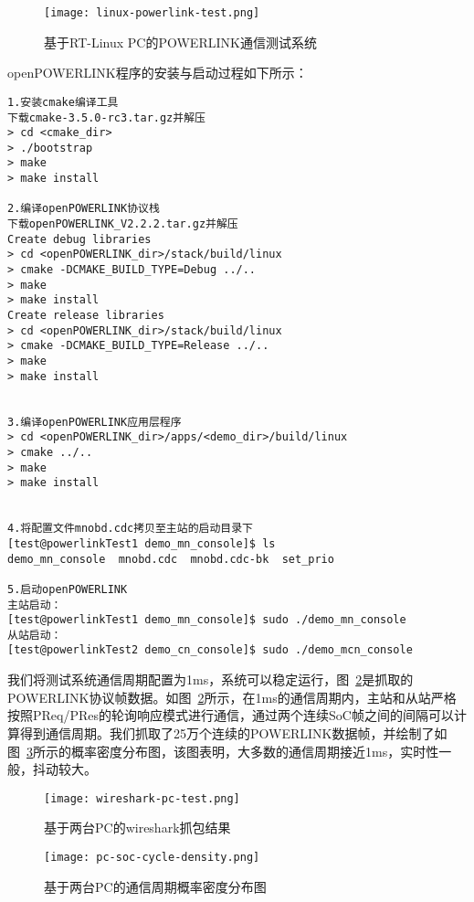 \begin{figure}[!htb]
  \centering
  \texttt{[image: linux-powerlink-test.png]}
  \caption{基于RT-Linux PC的POWERLINK通信测试系统}
  \label{fig:linux-powerlink-test}
\end{figure}

openPOWERLINK程序的安装与启动过程如下所示：

\begin{lstlisting}
1.安装cmake编译工具
下载cmake-3.5.0-rc3.tar.gz并解压
> cd <cmake_dir>
> ./bootstrap
> make
> make install

2.编译openPOWERLINK协议栈
下载openPOWERLINK_V2.2.2.tar.gz并解压
Create debug libraries
> cd <openPOWERLINK_dir>/stack/build/linux
> cmake -DCMAKE_BUILD_TYPE=Debug ../..
> make
> make install
Create release libraries
> cd <openPOWERLINK_dir>/stack/build/linux
> cmake -DCMAKE_BUILD_TYPE=Release ../..
> make
> make install


3.编译openPOWERLINK应用层程序
> cd <openPOWERLINK_dir>/apps/<demo_dir>/build/linux
> cmake ../..
> make
> make install


4.将配置文件mnobd.cdc拷贝至主站的启动目录下
[test@powerlinkTest1 demo_mn_console]$ ls
demo_mn_console  mnobd.cdc  mnobd.cdc-bk  set_prio

5.启动openPOWERLINK
主站启动：
[test@powerlinkTest1 demo_mn_console]$ sudo ./demo_mn_console
从站启动：
[test@powerlinkTest2 demo_cn_console]$ sudo ./demo_mcn_console

\end{lstlisting}

我们将测试系统通信周期配置为1ms，系统可以稳定运行，图~\ref{fig:wireshark-pc-test}是抓取的POWERLINK协议帧数据。如图~\ref{fig:wireshark-pc-test}所示，在1ms的通信周期内，主站和从站严格按照PReq/PRes的轮询响应模式进行通信，通过两个连续SoC帧之间的间隔可以计算得到通信周期。我们抓取了25万个连续的POWERLINK数据帧，并绘制了如图~\ref{fig:pc-soc-cycle-density}所示的概率密度分布图，该图表明，大多数的通信周期接近1ms，实时性一般，抖动较大。

\begin{figure}[!htb]
  \centering
  \texttt{[image: wireshark-pc-test.png]}
  \caption{基于两台PC的wireshark抓包结果}
  \label{fig:wireshark-pc-test}
\end{figure}

\begin{figure}[!htb]
  \centering
  \texttt{[image: pc-soc-cycle-density.png]}
  \caption{基于两台PC的通信周期概率密度分布图}
  \label{fig:pc-soc-cycle-density}
\end{figure}

